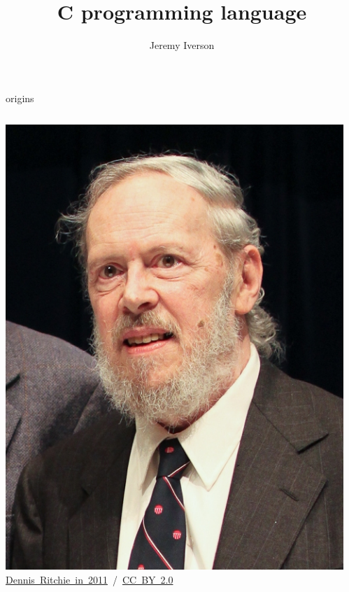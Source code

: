 \documentclass[10pt,t,usenames,dvipsnames]{beamer}
\title{C programming language}
\date{}
\author{Jeremy Iverson}
\institute{College of Saint Benedict \& Saint John's University}
\begin{document}
  \maketitle

  \begin{frame}{origins}
    \vspace{3ex}
    \begin{columns}
      \begin{column}{.38275\textwidth}
        \includegraphics[width=\textwidth]{Dennis_Ritchie_2011.jpg}\\
        \hfill \tiny{\href{https://en.wikipedia.org/wiki/Dennis\_Ritchie\#/media/File:Dennis\_Ritchie\_2011.jpg}{Dennis~Ritchie~in~2011}~/~\href{http://creativecommons.org/licenses/by-sa/2.0}{CC~BY~2.0}}
      \end{column}
      \begin{column}{.51725\textwidth}

\end{column}
\end{columns}
\end{frame}
\end{document}
